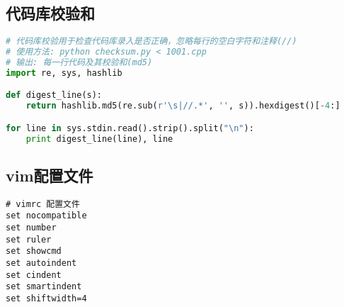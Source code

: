 \subsection{代码库校验和}
\begin{lstlisting}[language=Python]
# 代码库校验用于检查代码库录入是否正确，忽略每行的空白字符和注释(//)
# 使用方法: python checksum.py < 1001.cpp
# 输出: 每一行代码及其校验和(md5)
import re, sys, hashlib

def digest_line(s):
	return hashlib.md5(re.sub(r'\s|//.*', '', s)).hexdigest()[-4:]

for line in sys.stdin.read().strip().split("\n"):
	print digest_line(line), line
\end{lstlisting}
\subsection{vim配置文件}
\begin{lstlisting}[language={}]
# vimrc 配置文件
set nocompatible
set number
set ruler
set showcmd
set autoindent
set cindent
set smartindent
set shiftwidth=4
\end{lstlisting}
